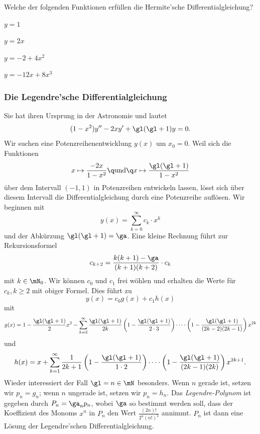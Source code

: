 \documentclass[%
draft,
11pt,%
twoside,%
titlepage,%
german,%
headsepline%
]{scrartcl}
\begin{document}
\begin{ueb}
Welche der folgenden Funktionen erf\"ullen die Hermite'sche Differentialgleichung?

\begin{minipage}{0.3\textwidth}
\begin{enumeratea}
\item $y=1$
\item $y=2x$
\end{enumeratea}
\end{minipage}
\begin{minipage}{0.4\textwidth}
\begin{enumeratea}
\setcounter{enumi}{2}
\item $y=-2+4x^2$
\item $y=-12x+8x^3$
\end{enumeratea}
\end{minipage}
\end{ueb}

\subsubsection{Die Legendre'sche Differentialgleichung}

Sie hat ihren Ursprung in der Astronomie und lautet
\begin{equation}\label{eq:legendre}
(1-x^2)y''-2xy'+\gl(\gl+1)y=0.
\end{equation}
Wir suchen eine Potenzreihenentwicklung $y(x)$ um $x_0=0$. Weil sich die Funktionen
$$x\mapsto\frac{-2x}{1-x^2}\q\text{und}\q x\mapsto\frac{\gl(\gl+1)}{1-x^2}$$
\"uber dem Intervall $(-1,1)$ in Potenzreihen entwickeln lassen, l\"osst sich \"uber diesem Intervall die Differentialgleichung durch eine Potenzreihe aufl\"osen.
Wir beginnen mit
$$y(x)=\sum_{k=0}^\infty c_k\cdot x^k$$
und der Abk\"urzung $\gl(\gl+1)=\ga$. Eine kleine Rechnung f\"uhrt zur Rekursionsformel
$$c_{k+2}=\frac{k(k+1)-\ga}{(k+1)(k+2)}\cdot c_k$$
mit $k\in\mN_0$. Wir k\"onnen $c_0$ und $c_1$ frei w\"ohlen und erhalten die Werte f\"ur $c_k, k\geq2$ mit obiger Formel. Dies f\"uhrt zu
$$y(x)=c_0g(x)+c_1h(x)$$
mit
$$
g(x)=1-\frac{\gl(\gl+1)}{2}x^2
-\sum_{k=2}^\infty\frac{\gl(\gl+1)}{2k}\left(1-\frac{\gl(\gl+1)}{2\cdot3}\right)
\dots \cdot \left(1-\frac{\gl(\gl+1)}{(2k-2)(2k-1)}\right) x^{2k}
$$
und
$$
h(x)=x
+\sum_{k=1}^\infty\frac{1}{2k+1}\left(1-\frac{\gl(\gl+1)}{1\cdot2}\right)
\dots\cdot \left(1-\frac{\gl(\gl+1)}{(2k-1)(2k)}\right) x^{2k+1}.
$$
Wieder interessiert der Fall $\gl=n\in\mN$ besonders. Wenn $n$ gerade ist, setzen wir $p_n=g_n$; wenn $n$ ungerade ist, setzen wir $p_n=h_n$. Das \emph{Legendre-Polynom} ist gegeben durch $P_n=\ga_np_n$, wobei $\ga$ so bestimmt werden soll, dass der Koeffizient des Monoms $x^n$ in $P_n$ den Wert $\frac{(2n)!}{2^n(n!)^2}$ annimmt. $P_n$ ist dann eine L\"osung der Legendre'schen Differentialgleichung.
\end{document}
